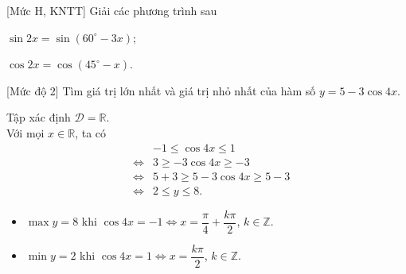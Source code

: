 \begin{bt}%
[Mức H, KNTT]%
	Giải các phương trình sau
	\begin{listEX}[2]
		\item $\sin 2x  = \sin (60^{\circ} - 3x)$;
		\item $\cos 2 x=\cos \left(45^{\circ}-x\right)$.
	\end{listEX}
	
\end{bt}

\begin{bt}%
	[Mức độ 2]
	Tìm giá trị lớn nhất và giá trị nhỏ nhất của hàm số $ y=5-3 \cos 4 x $.
	\loigiai
	{
		Tập xác định $ \mathscr{D}=\mathbb{R}$.\\
		Với mọi $x \in \mathbb{R} $, ta có
		\begin{eqnarray*}
			&&-1 \leq \cos 4 x \leq 1 \\
			&\Leftrightarrow& 3 \geq-3 \cos 4 x \geq-3\\
			&\Leftrightarrow& 5+3 \geq 5-3 \cos 4 x \geq 5-3 \\
			&\Leftrightarrow& 2 \leq y \leq 8. 
		\end{eqnarray*}
	\begin{itemize}
		\item $ \max y=8 $ khi $ \cos 4 x=-1 \Leftrightarrow x=\dfrac{\pi}{4}+\dfrac{k\pi}{2}$, $k\in\mathbb{Z}$.
		\item $ \min y=2 $ khi $ \cos 4 x=1 \Leftrightarrow x=\dfrac{k\pi}{2}$, $k\in\mathbb{Z}$.
	\end{itemize}
	}
\end{bt}

